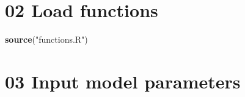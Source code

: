 \documentclass[
]{article}
\newenvironment{Shaded}{\begin{snugshade}}{\end{snugshade}}
\newcommand{\KeywordTok}[1]{\textcolor[rgb]{0.13,0.29,0.53}{\textbf{#1}}}
\newcommand{\NormalTok}[1]{#1}
\newcommand{\StringTok}[1]{\textcolor[rgb]{0.31,0.60,0.02}{#1}}
\begin{document}
\hypertarget{load-functions}{%
\section{02 Load functions}\label{load-functions}}

\begin{Shaded}
\begin{Highlighting}[]
\KeywordTok{source}\NormalTok{(}\StringTok{"functions.R"}\NormalTok{)}
\end{Highlighting}
\end{Shaded}

\hypertarget{input-model-parameters}{%
\section{03 Input model parameters}\label{input-model-parameters}}
\end{document}
